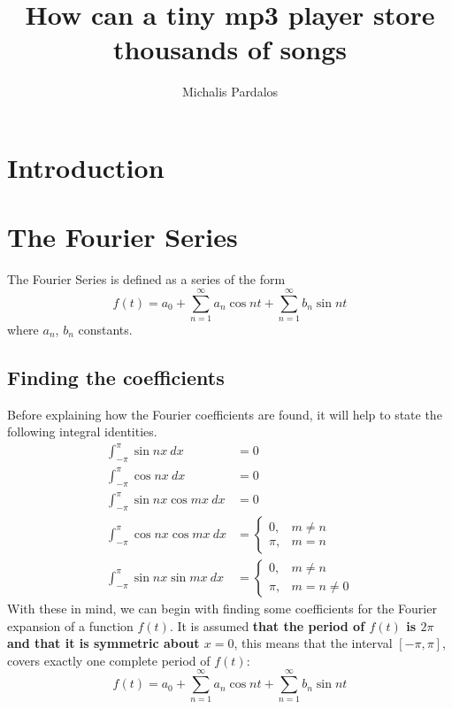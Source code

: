 \documentclass [12pt, titlepage]{article}
\title{How can a tiny mp3 player store thousands of songs}
\author{Michalis Pardalos}
\date{}
\numberwithin{equation}{section}
\let\oldsection\section
\renewcommand\section{\clearpage\oldsection}
\newcommand{\piint}{\int_{-\pi}^{\pi}} %
\begin{document}
\maketitle
\tableofcontents

\section{Introduction}
\section{The Fourier Series}

The Fourier Series is defined as a series of the form
%
\begin{equation} \label{eq:fourier_series}
    f(t) = a_0 + \sum_{n=1}^{\infty}a_n \cos{nt} + \sum_{n=1}^{\infty}b_n \sin{nt}
\end{equation}
%
where $a_n$, $b_n$ constants. 

\subsection{Finding the coefficients} \label{sec:fourier_coefficients}

Before explaining how the Fourier coefficients are found, it will help to state the
following integral identities\autocite[438]{courant_calculus_1}.
%
\begin{align}
    \piint \sin{nx}\ dx          & = 0 \label{eq:sinint}\\
    \piint \cos{nx}\ dx          & = 0 \label{eq:cosint}\\
    \piint \sin{nx}\cos{mx}\ dx & = 0\label{eq:sincosint}\\
    \piint \cos{nx}\cos{mx}\ dx & =
    \begin{cases}
        0,   & m\not=n\\
        \pi, & m=n
    \end{cases} \label{eq:coscosint}\\
    \piint \sin{nx}\sin{mx}\ dx &= 
    \begin{cases}
        0,   & m\not=n\\
        \pi, & m=n\not=0
    \end{cases} \label{eq:sinsinint}
\end{align}
%
With these in mind, we can begin with finding some coefficients for the Fourier expansion of
a function $f(t)$. It is assumed \textbf{that the period of $f(t)$ is
$2\pi$ and that it is symmetric about $x=0$}, this means that the interval $[-\pi, \pi]$,
covers exactly one complete period of $f(t)$:
%
\begin{equation*}
    f(t) = a_0 + \sum_{n=1}^\infty a_n \cos{nt} + \sum_{n=1}^{\infty} b_n \sin{nt}
\end{equation*}
%
\end{document}
